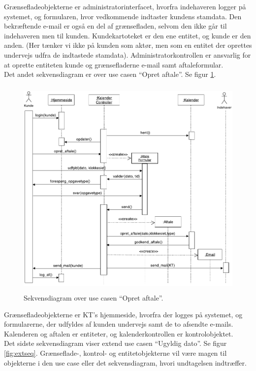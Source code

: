 \documentclass[12pt]{article}   %
\begin{document}
Grænsefladeobjekterne er administratorinterfacet, hvorfra indehaveren logger på systemet, og formularen, hvor vedkommende indtaster kundens stamdata. Den bekræftende
e-mail er også en del af grænsefladen, selvom den ikke går til indehaveren men til kunden. Kundekartoteket er den ene entitet, og kunde er den anden. (Her tænker vi ikke på kunden som aktør, men som en entitet der oprettes undervejs
udfra de indtastede stamdata). Administratorkontrollen er ansvarlig for at oprette entiteten kunde og grænsefladerne e-mail samt aftaleformular. \\
\indent Det andet sekvensdiagram er over use casen ``Opret aftale''. Se figur \ref{fig:aft}. \\

\begin{figure}[!ht]
\includegraphics[width=14cm, height=11cm]{seq.pdf}
\caption{Sekvensdiagram over use casen ``Opret aftale''.}
\label{fig:aft}
\end{figure}

Grænsefladeobjekterne er KT's hjemmeside, hvorfra der logges på systemet, og formularerne, der udfyldes af kunden undervejs samt de to afsendte e-mails. Kalenderen og aftalen er entiteter, og kalenderkontrollen er kontrolobjektet. \\
\indent Det sidste sekvensdiagram viser extend use casen ``Ugyldig dato''. Se figur \ref{fig:extseq}. Grænseflade-, kontrol- og entitetobjekterne vil være magen til objekterne i den use case eller det sekvensdiagram, hvori undtagelsen indtræffer.
\end{document}
